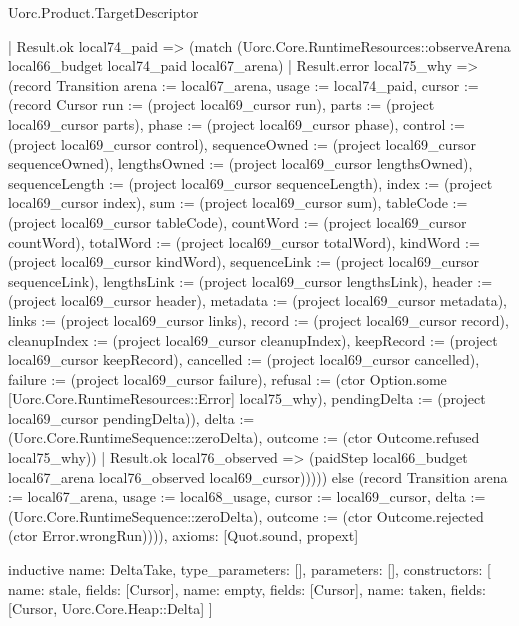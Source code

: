 \begin{lexlean}{Uorc.Product.TargetDescriptor}
\begin{semanticmodule}
{        | Result.ok local74_paid => (match (Uorc.Core.RuntimeResources::observeArena local66_budget local74_paid local67_arena)
          | Result.error local75_why => (record Transition {arena := local67_arena, usage := local74_paid, cursor := (record Cursor {run := (project local69_cursor run), parts := (project local69_cursor parts), phase := (project local69_cursor phase), control := (project local69_cursor control), sequenceOwned := (project local69_cursor sequenceOwned), lengthsOwned := (project local69_cursor lengthsOwned), sequenceLength := (project local69_cursor sequenceLength), index := (project local69_cursor index), sum := (project local69_cursor sum), tableCode := (project local69_cursor tableCode), countWord := (project local69_cursor countWord), totalWord := (project local69_cursor totalWord), kindWord := (project local69_cursor kindWord), sequenceLink := (project local69_cursor sequenceLink), lengthsLink := (project local69_cursor lengthsLink), header := (project local69_cursor header), metadata := (project local69_cursor metadata), links := (project local69_cursor links), record := (project local69_cursor record), cleanupIndex := (project local69_cursor cleanupIndex), keepRecord := (project local69_cursor keepRecord), cancelled := (project local69_cursor cancelled), failure := (project local69_cursor failure), refusal := (ctor Option.some [Uorc.Core.RuntimeResources::Error] local75_why), pendingDelta := (project local69_cursor pendingDelta)}), delta := (Uorc.Core.RuntimeSequence::zeroDelta), outcome := (ctor Outcome.refused local75_why)})
          | Result.ok local76_observed => (paidStep local66_budget local67_arena local76_observed local69_cursor))))) else (record Transition {arena := local67_arena, usage := local68_usage, cursor := local69_cursor, delta := (Uorc.Core.RuntimeSequence::zeroDelta), outcome := (ctor Outcome.rejected (ctor Error.wrongRun))})),
  axioms: [Quot.sound, propext]
}

inductive{
  name: DeltaTake,
  type_parameters: [],
  parameters: [],
  constructors: [
    {name: stale, fields: [Cursor]},
    {name: empty, fields: [Cursor]},
    {name: taken, fields: [Cursor, Uorc.Core.Heap::Delta]}
  ]
}


\end{semanticmodule}
\end{lexlean}
